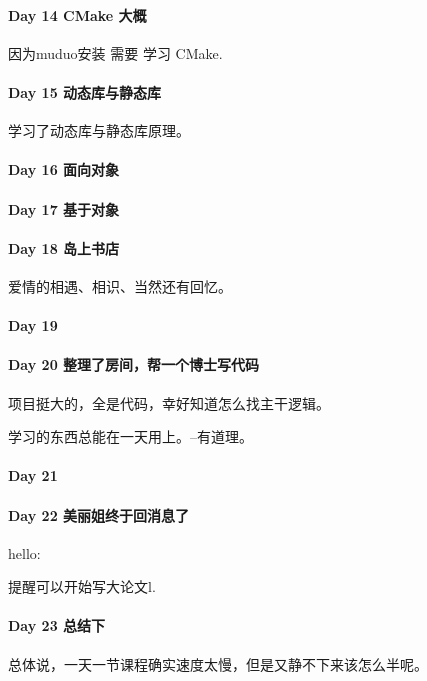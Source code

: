 \documentclass[UTF8,a4paper,8pt]{ctexart}
\begin{document}
	\paragraph{Day 14   CMake 大概   \quad     }
		因为muduo安装 需要 学习 CMake.
		
	\paragraph{Day 15   动态库与静态库   \quad     }
		学习了动态库与静态库原理。
		
		
	\paragraph{Day 16   面向对象    \quad     }
	\paragraph{Day 17   基于对象  \quad     }
	\paragraph{Day 18   岛上书店   \quad     }
		爱情的相遇、相识、当然还有回忆。
		
	\paragraph{Day 19      \quad     }
	\paragraph{Day 20  整理了房间，帮一个博士写代码    \quad     }
		项目挺大的，全是代码，幸好知道怎么找主干逻辑。
		
		学习的东西总能在一天用上。--有道理。
	\paragraph{Day 21      \quad     }
	\paragraph{Day 22  美丽姐终于回消息了    \quad     }
		hello:
		
		提醒可以开始写大论文l.
	\paragraph{Day 23  总结下    \quad     }
		总体说，一天一节课程确实速度太慢，但是又静不下来该怎么半呢。
		
\end{document}
